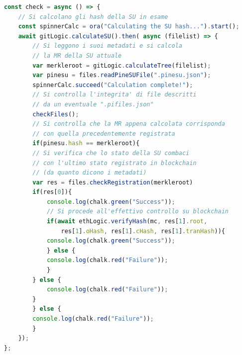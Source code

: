 \begin{lstlisting}[language=JavaScript]
const check = async () => {
    // Si calcolano gli hash della SU in esame
    const spinnerCalc = ora("Calculating the SU hash...").start();
    await gitLogic.calculateSU().then( async (filelist) => {
        // Si leggono i suoi metadati e si calcola
        // la MR della SU attuale
        var merkleroot = gitLogic.calculateTree(filelist);
        var pinesu = files.readPineSUFile(".pinesu.json");
        spinnerCalc.succeed("Calculation complete!");
        // Si controlla l'integrita' di file descritti
        // da un eventuale ".pifiles.json"
        checkFiles();
        // Si controlla che la MR appena calcolata corrisponda
        // con quella precedentemente registrata
        if(pinesu.hash == merkleroot){
        // Si verifica che lo stato della SU combaci
        // con l'ultimo stato registrato in blockchain
        // (da quanto dicono i metadati)
        var res = files.checkRegistration(merkleroot)
        if(res[0]){
            console.log(chalk.green("Success"));
            // Si procede all'effettivo controllo su blockchain
            if(await ethLogic.verifyHash(mc, res[1].root,
                res[1].oHash, res[1].cHash, res[1].tranHash)){
            console.log(chalk.green("Success"));
            } else {
            console.log(chalk.red("Failure"));
            }
        } else {
            console.log(chalk.red("Failure"));
        }
        } else {
        console.log(chalk.red("Failure"));
        }
    });
};
\end{lstlisting}